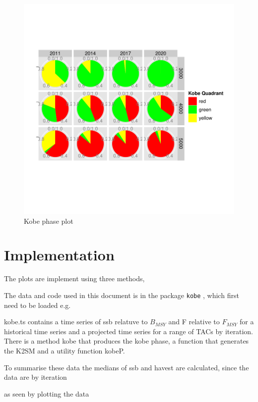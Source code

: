 \documentclass[a4paper, 11pt, oldtoc]{artikel1}
\begin{document}
\begin{figure}
\begin{center}
\includegraphics{kobe-008}
\caption{Kobe phase plot}
\end{center}
\end{figure}

\section{Implementation}



The plots are implement using three methods, 

The data and code used in this document is in the package {\tt kobe} , which first need to be loaded e.g.



kobe.ts contains a time series of ssb relatuve to $B_{MSY}$ and F relative to $F_{MSY}$ for a historical time series and a projected time series for a range of TACs by iteration.
There is a method kobe that produces the kobe phase, a function that generates the K2SM and a utility function kobeP.

To summarise these data the medians of ssb and havest are calculated, since the data are by iteration

as seen by plotting the data
\end{document}
